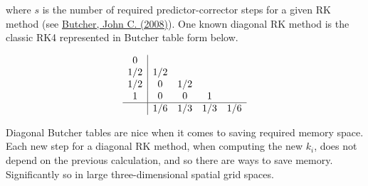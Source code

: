 \documentclass[landscape,letterpaper,10pt,english]{article}
\begin{document}
where \(s\) is the number of required predictor-corrector steps for a
given RK method (see
\href{https://onlinelibrary.wiley.com/doi/book/10.1002/9780470753767}{Butcher,
John C. (2008)}). One known diagonal RK method is the classic RK4
represented in Butcher table form below.

\[\begin{array}{c|cccc}
    0 & \\
    1/2 & 1/2 & \\ 
    1/2 & 0 & 1/2 & \\
    1 & 0 & 0 & 1 & \\ \hline
     & 1/6 & 1/3 & 1/3 & 1/6
\end{array} \]

Diagonal Butcher tables are nice when it comes to saving required memory
space. Each new step for a diagonal RK method, when computing the new
\(k_i\), does not depend on the previous calculation, and so there are
ways to save memory. Significantly so in large three-dimensional spatial
grid spaces.
\end{document}
